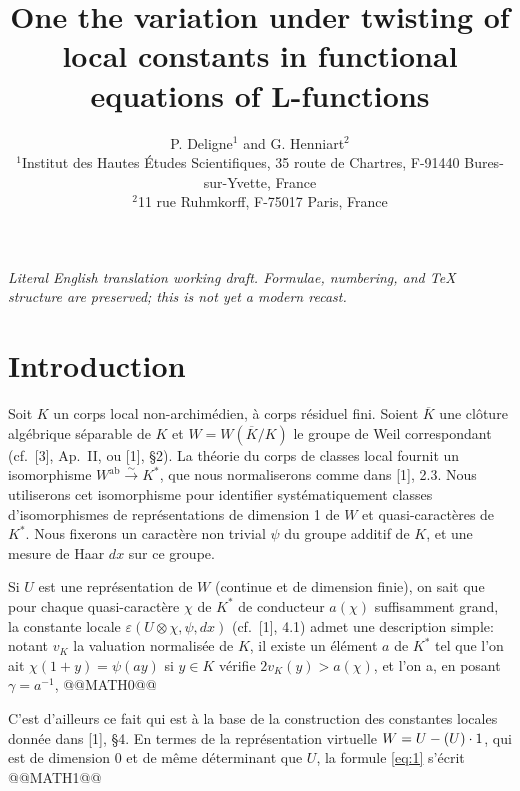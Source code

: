 \documentclass[12pt,a4paper]{article}
\theoremstyle{plain}
\theoremstyle{definition}
\theoremstyle{remark}
\let\dim\relax\let\det\relax
\begin{document}
\begin{center}\small\emph{Literal English translation working draft. Formulae, numbering, and TeX structure are preserved; this is not yet a modern recast.}\end{center}
\vspace{0.5em}


\title{One the variation under twisting of local constants in functional equations of L-functions}
\author{P. Deligne$^1$ and G. Henniart$^2$\\[0.5em]
\small $^1$Institut des Hautes \'Etudes Scientifiques, 35 route de Chartres, F-91440 Bures-sur-Yvette, France\\
\small $^2$11 rue Ruhmkorff, F-75017 Paris, France}
\date{}
\maketitle

\section*{Introduction}

Soit $K$ un corps local non-archim\'edien, \`a corps r\'esiduel fini. Soient $\overline{K}$ une cl\^oture alg\'ebrique s\'eparable de $K$ et $W = W(\overline{K}/K)$ le groupe de Weil correspondant (cf.~[3], Ap.~II, ou [1], \S 2). La th\'eorie du corps de classes local fournit un isomorphisme $W^{\text{ab}} \xrightarrow{\sim} K^*$, que nous normaliserons comme dans [1], 2.3. Nous utiliserons cet isomorphisme pour identifier syst\'ematiquement classes d'isomorphismes de repr\'esentations de dimension 1 de $W$ et quasi-caract\`eres de $K^*$. Nous fixerons un caract\`ere non trivial $\psi$ du groupe additif de $K$, et une mesure de Haar $dx$ sur ce groupe.

Si $U$ est une repr\'esentation de $W$ (continue et de dimension finie), on sait que pour chaque quasi-caract\`ere $\chi$ de $K^*$ de conducteur $a(\chi)$ suffisamment grand, la constante locale $\varepsilon(U \otimes \chi, \psi, dx)$ (cf.~[1], 4.1) admet une description simple: notant $v_K$ la valuation normalis\'ee de $K$, il existe un \'el\'ement $a$ de $K^*$ tel que l'on ait $\chi(1+y) = \psi(ay)$ si $y \in K$ v\'erifie $2v_K(y) > a(\chi)$, et l'on a, en posant $\gamma = a^{-1}$,
@@MATH0@@

C'est d'ailleurs ce fait qui est \`a la base de la construction des constantes locales donn\'ee dans [1], \S 4. En termes de la repr\'esentation virtuelle $W = U - (\dim U) \cdot 1$, qui est de dimension 0 et de m\^eme d\'eterminant que $U$, la formule \eqref{eq:1} s'\'ecrit
@@MATH1@@
\end{document}
